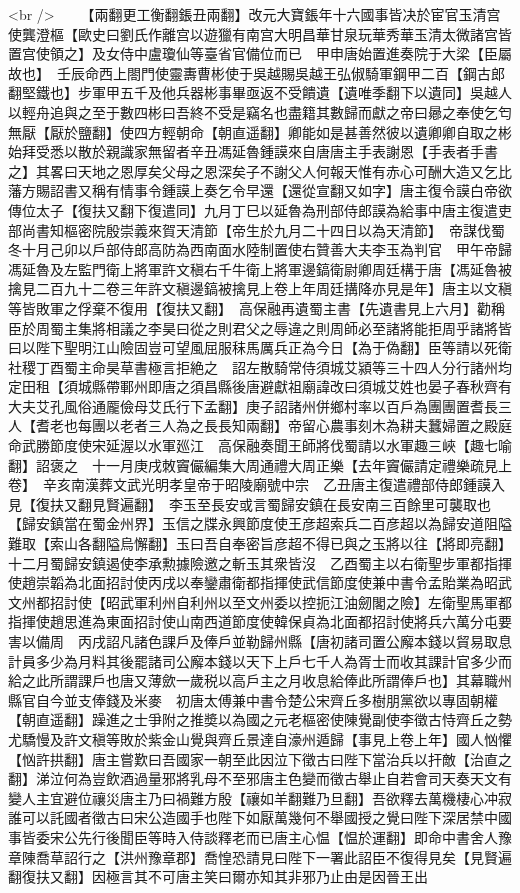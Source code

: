 <br />
　　【兩翻更工衡翻鋹丑兩翻】改元大寶鋹年十六國事皆决於宦官玉清宫使龔澄樞【歐史曰劉氏作離宫以遊獵有南宫大明昌華甘泉玩華秀華玉清太微諸宫皆置宫使領之】及女侍中盧瓊仙等臺省官備位而已　甲申唐始置進奏院于大梁【臣屬故也】　壬辰命西上閤門使靈夀曹彬使于吳越賜吳越王弘俶騎軍鋼甲二百【鋼古郎翻堅鐵也】步軍甲五千及他兵器彬事畢亟返不受饋遺【遺唯季翻下以遺同】吳越人以輕舟追與之至于數四彬曰吾終不受是竊名也盡籍其數歸而獻之帝曰曏之奉使乞匄無厭【厭於鹽翻】使四方輕朝命【朝直遥翻】卿能如是甚善然彼以遺卿卿自取之彬始拜受悉以散於親識家無留者辛丑馮延魯鍾謨來自唐唐主手表謝恩【手表者手書之】其畧曰天地之恩厚矣父母之恩深矣子不謝父人何報天惟有赤心可酬大造又乞比藩方賜詔書又稱有情事令鍾謨上奏乞令早還【還從宣翻又如字】唐主復令謨白帝欲傳位太子【復扶又翻下復遣同】九月丁巳以延魯為刑部侍郎謨為給事中唐主復遣吏部尚書知樞密院殷崇義來賀天清節【帝生於九月二十四日以為天清節】　帝謀伐蜀冬十月己卯以戶部侍郎高防為西南面水陸制置使右贊善大夫李玉為判官　甲午帝歸馮延魯及左監門衛上將軍許文稹右千牛衛上將軍邊鎬衛尉卿周廷構于唐【馮延魯被擒見二百九十二卷三年許文稹邊鎬被擒見上卷上年周廷搆降亦見是年】唐主以文稹等皆敗軍之俘棄不復用【復扶又翻】　高保融再遺蜀主書【先遺書見上六月】勸稱臣於周蜀主集將相議之李昊曰從之則君父之辱違之則周師必至諸將能拒周乎諸將皆曰以陛下聖明江山險固豈可望風屈服秣馬厲兵正為今日【為于偽翻】臣等請以死衛社稷丁酉蜀主命昊草書極言拒絶之　詔左散騎常侍須城艾潁等三十四人分行諸州均定田租【須城縣帶鄆州即唐之須昌縣後唐避獻祖廟諱改曰須城艾姓也晏子春秋齊有大夫艾孔風俗通龎儉母艾氏行下孟翻】庚子詔諸州併鄉村率以百戶為團團置耆長三人【耆老也每團以老者三人為之長長知兩翻】帝留心農事刻木為耕夫蠶婦置之殿庭　命武勝節度使宋延渥以水軍廵江　高保融奏聞王師將伐蜀請以水軍趣三峽【趣七喻翻】詔褒之　十一月庚戌敇竇儼編集大周通禮大周正樂【去年竇儼請定禮樂疏見上卷】　辛亥南漢葬文武光明孝皇帝于昭陵廟號中宗　乙丑唐主復遣禮部侍郎鍾謨入見【復扶又翻見賢遍翻】　李玉至長安或言蜀歸安鎮在長安南三百餘里可襲取也【歸安鎮當在蜀金州界】玉信之牒永興節度使王彦超索兵二百彦超以為歸安道阻隘難取【索山各翻隘烏懈翻】玉曰吾自奉密旨彦超不得已與之玉將以往【將即亮翻】十二月蜀歸安鎮遏使李承勲據險邀之斬玉其衆皆沒　乙酉蜀主以右衛聖步軍都指揮使趙崇韜為北面招討使丙戌以奉鑾肅衛都指揮使武信節度使兼中書令孟貽業為昭武文州都招討使【昭武軍利州自利州以至文州委以控扼江油劒閣之險】左衛聖馬軍都指揮使趙思進為東面招討使山南西道節度使韓保貞為北面都招討使將兵六萬分屯要害以備周　丙戌詔凡諸色課戶及俸戶並勒歸州縣【唐初諸司置公廨本錢以貿易取息計員多少為月料其後罷諸司公廨本錢以天下上戶七千人為胥士而收其課計官多少而給之此所謂課戶也唐又薄歛一歲税以高戶主之月收息給俸此所謂俸戶也】其幕職州縣官自今並支俸錢及米麥　初唐太傅兼中書令楚公宋齊丘多樹朋黨欲以專固朝權【朝直遥翻】躁進之士爭附之推奬以為國之元老樞密使陳覺副使李徵古恃齊丘之勢尤驕慢及許文稹等敗於紫金山覺與齊丘景達自濠州遁歸【事見上卷上年】國人忷懼【忷許拱翻】唐主嘗歎曰吾國家一朝至此因泣下徵古曰陛下當治兵以扞敵【治直之翻】涕泣何為豈飲酒過量邪將乳母不至邪唐主色變而徵古舉止自若會司天奏天文有變人主宜避位禳災唐主乃曰禍難方殷【禳如羊翻難乃旦翻】吾欲釋去萬機棲心冲寂誰可以託國者徵古曰宋公造國手也陛下如厭萬幾何不舉國授之覺曰陛下深居禁中國事皆委宋公先行後聞臣等時入侍談釋老而已唐主心愠【愠於運翻】即命中書舍人豫章陳喬草詔行之【洪州豫章郡】喬惶恐請見曰陛下一署此詔臣不復得見矣【見賢遍翻復扶又翻】因極言其不可唐主笑曰爾亦知其非邪乃止由是因晉王出